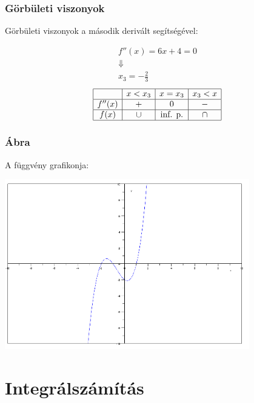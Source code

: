 \documentclass[ignorenonframetext]{beamer}
\begin{document}
\begin{frame}[fragile]
    \frametitle{Görbületi viszonyok}
    Görbületi viszonyok a második derivált segítségével:


    \begin{gather*}
        f''(x)=6x+4=0\\
        \Downarrow\\
        x_3=-\frac{2}{3}
    \end{gather*}
    \[
        \begin{array}{|c|c|c|c|}
            \hline
                   & x<x_3 & x=x_3          & x_3<x \\
            \hline
            f''(x) & +     & 0              & -     \\
            \hline
            f(x)   & \cup  & \text{inf. p.} & \cap  \\
            \hline
        \end{array}
    \]

\end{frame}
\begin{frame}[fragile]
    \frametitle{Ábra}
    A függvény grafikonja:
    \\
    \begin{center}
        \includegraphics[width=0.8\textwidth]{03_pic04_1}
    \end{center}

\end{frame}
\section{Integrálszámítás}
\end{document}
